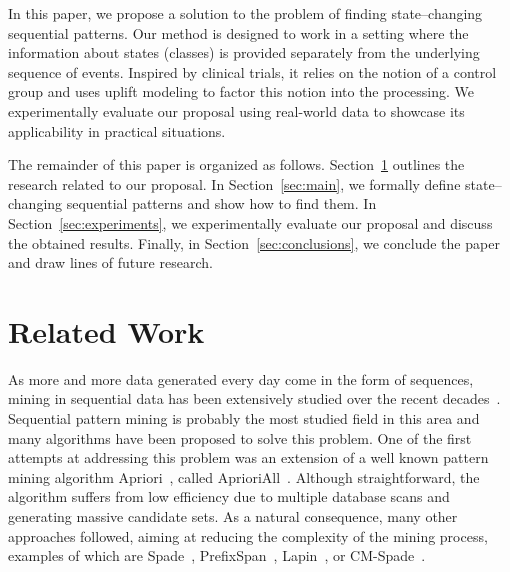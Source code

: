 \documentclass[runningheads,a4paper]{llncs}
\begin{document}
In this paper, we propose a solution to the problem of finding state--changing sequential patterns.
Our method is designed to work in a setting where the information about states (classes) is provided separately from the underlying sequence of events.
Inspired by clinical trials, it relies on the notion of a control group and uses uplift modeling to factor this notion into the processing.
We experimentally evaluate our proposal using real-world data to showcase its applicability in practical situations.

The remainder of this paper is organized as follows.
Section~\ref{sec:related} outlines the research related to our proposal.
In Section~\ref{sec:main}, we formally define state--changing sequential patterns and show how to find them.
In Section~\ref{sec:experiments}, we experimentally evaluate our proposal and discuss the obtained results.
Finally, in Section~\ref{sec:conclusions}, we conclude the paper and draw lines of future research.

\section{Related Work}
\label{sec:related}
As more and more data generated every day come in the form of sequences, mining in sequential data has been extensively studied over the recent decades~\cite{Dong:2009,Fournier:2017}.
Sequential pattern mining is probably the most studied field in this area and many algorithms have been proposed to solve this problem.
One of the first attempts at addressing this problem was an extension of a well known pattern mining algorithm Apriori~\cite{Agrawal:1994}, called AprioriAll~\cite{Agrawal:1995}.
Although straightforward, the algorithm suffers from low efficiency due to multiple database scans and generating massive candidate sets.
As a natural consequence, many other approaches followed, aiming at reducing the complexity of the mining process, examples of which are Spade~\cite{Zaki:2001}, PrefixSpan~\cite{Pei:2004}, Lapin~\cite{Yang:2007}, or CM-Spade~\cite{Fournier:2014}.
\end{document}
